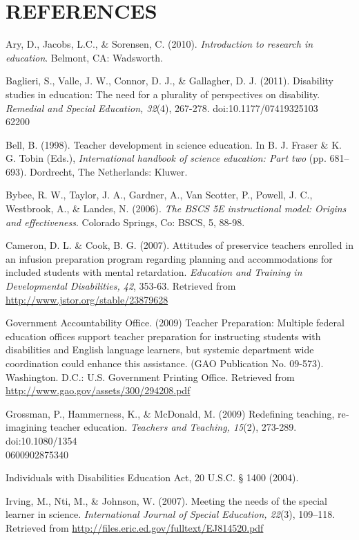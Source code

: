 \documentclass[11.5pt]{sig-alternate} %
\begin{document}
\section*{REFERENCES}\par 

\leftskip 0.25in
\parindent -0.25in 
Ary, D., Jacobs, L.C., \& Sorensen, C. (2010). \textit{Introduction to research in education}.  Belmont, CA: Wadsworth.

Baglieri, S., Valle, J. W., Connor, D. J., \& Gallagher, D. J. (2011). Disability studies in education: The need for a plurality of perspectives on disability. \textit{Remedial and Special Education, 32}(4), 267-278. doi:10.1177/07419325103\\62200

Bell, B. (1998). Teacher development in science education. In B. J. Fraser \& K. G. Tobin (Eds.), \textit{International handbook of science education: Part two} (pp. 681–693). Dordrecht, The Netherlands: Kluwer.

Bybee, R. W., Taylor, J. A., Gardner, A., Van Scotter, P., Powell, J. C., Westbrook, A., \& Landes, N. (2006). \textit{The BSCS 5E instructional model: Origins and effectiveness}. Colorado Springs, Co: BSCS, 5, 88-98.

Cameron, D. L. \& Cook, B. G. (2007). Attitudes of preservice teachers enrolled in an infusion preparation program regarding planning and accommodations for included students with mental retardation. \textit{Education and Training in Developmental Disabilities, 42}, 353-63. Retrieved from \url{http://www.jstor.org/stable/23879628}

Government Accountability Office. (2009) Teacher Preparation: Multiple federal education offices support teacher preparation for instructing students with disabilities and English language learners, but systemic department wide coordination could enhance this assistance. (GAO Publication No. 09-573). Washington. D.C.: U.S. Government Printing Office. Retrieved from \url{http://www.gao.gov/assets/300/294208.pdf} 

Grossman, P.,  Hammerness, K.,  \& McDonald, M.  (2009) Redefining teaching, re‐imagining teacher education. \textit{Teachers and Teaching, 15}(2), 273-289. doi:10.1080/1354\\0600902875340

Individuals with Disabilities Education Act, 20 U.S.C. § 1400 (2004).

Irving, M., Nti, M., \& Johnson, W. (2007). Meeting the needs of the special learner in science. \textit{International Journal of Special Education, 22}(3), 109–118. Retrieved from \url{http://files.eric.ed.gov/fulltext/EJ814520.pdf}
\end{document}
